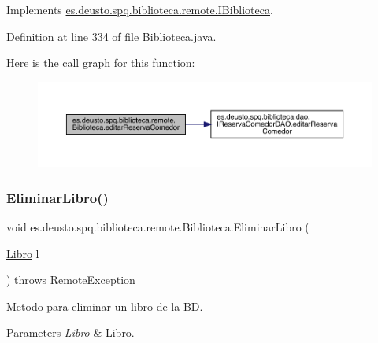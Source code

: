 Implements \mbox{\hyperlink{interfacees_1_1deusto_1_1spq_1_1biblioteca_1_1remote_1_1_i_biblioteca_ac492277af5ed00def28276cd8b0a5394}{es.\+deusto.\+spq.\+biblioteca.\+remote.\+I\+Biblioteca}}.



Definition at line 334 of file Biblioteca.\+java.

Here is the call graph for this function\+:
\nopagebreak
\begin{figure}[H]
\begin{center}
\leavevmode
\includegraphics[width=350pt]{classes_1_1deusto_1_1spq_1_1biblioteca_1_1remote_1_1_biblioteca_a51fa3f46456f63c8e2e903359ab0a482_cgraph}
\end{center}
\end{figure}
\mbox{\label{classes_1_1deusto_1_1spq_1_1biblioteca_1_1remote_1_1_biblioteca_aec13dff9f9d789b103b51d243e52832e}} 
\subsubsection{\texorpdfstring{Eliminar\+Libro()}{EliminarLibro()}}
{\footnotesize\ttfamily void es.\+deusto.\+spq.\+biblioteca.\+remote.\+Biblioteca.\+Eliminar\+Libro (\begin{DoxyParamCaption}\item[{\mbox{\hyperlink{classes_1_1deusto_1_1spq_1_1biblioteca_1_1data_1_1_libro}{Libro}}}]{l }\end{DoxyParamCaption}) throws Remote\+Exception}

Metodo para eliminar un libro de la BD. 
\begin{DoxyParams}{Parameters}
{\em Libro} & Libro. \\
\hline
\end{DoxyParams}


